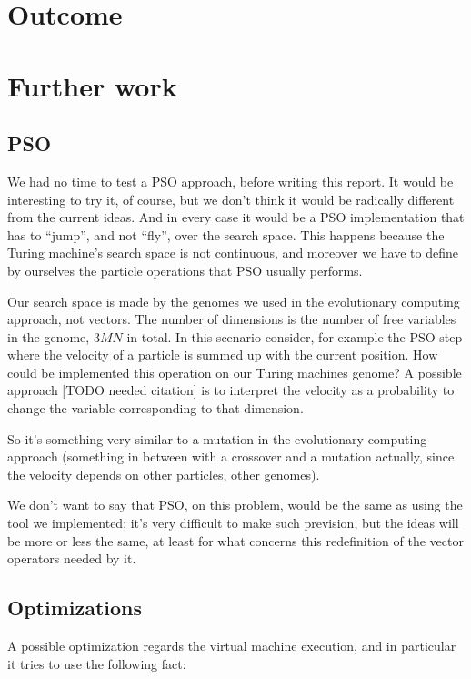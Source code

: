 \documentclass{report}
\begin{document}
\chapter{Outcome}
\label{chap:outcome}


\chapter{Further work}
\label{chap:fwork}

\section{PSO}
We had no time to test a PSO approach, before writing this report. It would be interesting to try it, of course, but we don't think it would be radically different from the current ideas. And in every case it would be a PSO implementation that has to ``jump'', and not ``fly'', over the search space. This happens because the Turing machine's search space is not continuous, and moreover we have to define by ourselves the particle operations that PSO usually performs.

Our search space is made by the genomes we used in the evolutionary computing approach, not vectors. The number of dimensions is the number of free variables in the genome, $3MN$ in total.
In this scenario consider, for example the PSO step where the velocity of a particle is summed up with the current position. How could be implemented this operation on our Turing machines genome? A possible approach [TODO needed citation] is to interpret the velocity as a probability to change the variable corresponding to that dimension.

So it's something very similar to a mutation in the evolutionary computing approach (something in between with a crossover and a mutation actually, since the velocity depends on other particles, other genomes).

We don't want to say that PSO, on this problem, would be the same as using the tool we implemented; it's very difficult to make such prevision, but the ideas will be more or less the same, at least for what concerns this redefinition of the vector operators needed by it.

\section{Optimizations}
A possible optimization regards the virtual machine execution, and in particular it tries to use the following fact:
\end{document}
